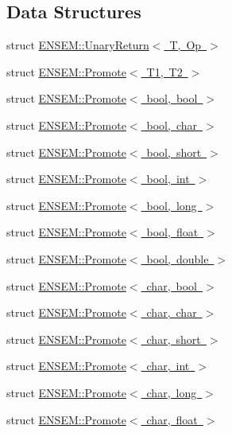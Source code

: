 \subsection*{Data Structures}
\begin{DoxyCompactItemize}
\item 
struct \mbox{\hyperlink{structENSEM_1_1UnaryReturn}{E\+N\+S\+E\+M\+::\+Unary\+Return$<$ T, Op $>$}}
\item 
struct \mbox{\hyperlink{structENSEM_1_1Promote}{E\+N\+S\+E\+M\+::\+Promote$<$ T1, T2 $>$}}
\item 
struct \mbox{\hyperlink{structENSEM_1_1Promote_3_01bool_00_01bool_01_4}{E\+N\+S\+E\+M\+::\+Promote$<$ bool, bool $>$}}
\item 
struct \mbox{\hyperlink{structENSEM_1_1Promote_3_01bool_00_01char_01_4}{E\+N\+S\+E\+M\+::\+Promote$<$ bool, char $>$}}
\item 
struct \mbox{\hyperlink{structENSEM_1_1Promote_3_01bool_00_01short_01_4}{E\+N\+S\+E\+M\+::\+Promote$<$ bool, short $>$}}
\item 
struct \mbox{\hyperlink{structENSEM_1_1Promote_3_01bool_00_01int_01_4}{E\+N\+S\+E\+M\+::\+Promote$<$ bool, int $>$}}
\item 
struct \mbox{\hyperlink{structENSEM_1_1Promote_3_01bool_00_01long_01_4}{E\+N\+S\+E\+M\+::\+Promote$<$ bool, long $>$}}
\item 
struct \mbox{\hyperlink{structENSEM_1_1Promote_3_01bool_00_01float_01_4}{E\+N\+S\+E\+M\+::\+Promote$<$ bool, float $>$}}
\item 
struct \mbox{\hyperlink{structENSEM_1_1Promote_3_01bool_00_01double_01_4}{E\+N\+S\+E\+M\+::\+Promote$<$ bool, double $>$}}
\item 
struct \mbox{\hyperlink{structENSEM_1_1Promote_3_01char_00_01bool_01_4}{E\+N\+S\+E\+M\+::\+Promote$<$ char, bool $>$}}
\item 
struct \mbox{\hyperlink{structENSEM_1_1Promote_3_01char_00_01char_01_4}{E\+N\+S\+E\+M\+::\+Promote$<$ char, char $>$}}
\item 
struct \mbox{\hyperlink{structENSEM_1_1Promote_3_01char_00_01short_01_4}{E\+N\+S\+E\+M\+::\+Promote$<$ char, short $>$}}
\item 
struct \mbox{\hyperlink{structENSEM_1_1Promote_3_01char_00_01int_01_4}{E\+N\+S\+E\+M\+::\+Promote$<$ char, int $>$}}
\item 
struct \mbox{\hyperlink{structENSEM_1_1Promote_3_01char_00_01long_01_4}{E\+N\+S\+E\+M\+::\+Promote$<$ char, long $>$}}
\item 
struct \mbox{\hyperlink{structENSEM_1_1Promote_3_01char_00_01float_01_4}{E\+N\+S\+E\+M\+::\+Promote$<$ char, float $>$}}

\end{DoxyCompactItemize}
